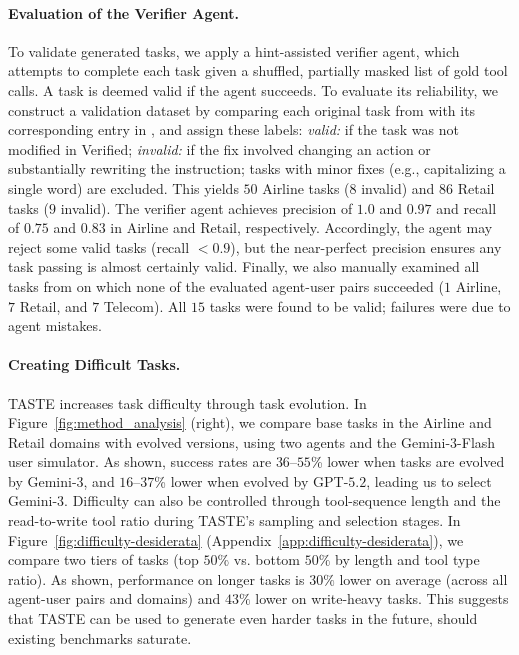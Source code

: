 \paragraph{Evaluation of the Verifier Agent.} To validate generated tasks, we apply a hint-assisted verifier agent, which attempts to complete each task given a shuffled, partially masked list of gold tool calls. A task is deemed valid if the agent succeeds. To evaluate its reliability, we construct a validation dataset by comparing each original task from \taubench with its corresponding entry in \taubenchverified, and assign these labels: \emph{valid:} if the task was not modified in Verified; \emph{invalid:} if the fix involved changing an action or substantially rewriting the instruction; tasks with minor fixes (e.g., capitalizing a single word) are excluded. This yields $50$ Airline tasks ($8$ invalid) and $86$ Retail tasks ($9$ invalid). The verifier agent achieves precision of $1.0$ and $0.97$ and recall of $0.75$ and $0.83$ in Airline and Retail, respectively. Accordingly, the agent may reject some valid tasks (recall $<0.9$), but the near-perfect precision ensures any task passing is almost certainly valid. Finally, we also manually examined all tasks from \ourbenchmark on which none of the evaluated agent-user pairs succeeded ($1$ Airline, $7$ Retail, and $7$ Telecom). All $15$ tasks were found to be valid; failures were due to agent mistakes.

\paragraph{Creating Difficult Tasks.} TASTE increases task difficulty through task evolution. In Figure~\ref{fig:method_analysis} (right), we compare base tasks in the Airline and Retail domains with evolved versions, using two agents and the Gemini-$3$-Flash user simulator. As shown, success rates are $36$--$55$\% lower when tasks are evolved by Gemini-$3$, and $16$--$37$\% lower when evolved by GPT-$5.2$, leading us to select Gemini-$3$. Difficulty can also be controlled through tool-sequence length and the read-to-write tool ratio during TASTE's sampling and selection stages. In Figure~\ref{fig:difficulty-desiderata} (Appendix~\ref{app:difficulty-desiderata}), we compare two tiers of tasks (top $50\%$ vs. bottom $50\%$ by length and tool type ratio). As shown, performance on longer tasks is $30\%$ lower on average (across all agent-user pairs and domains) and $43\%$ lower on write-heavy tasks. This suggests that TASTE can be used to generate even harder tasks in the future, should existing benchmarks saturate.

